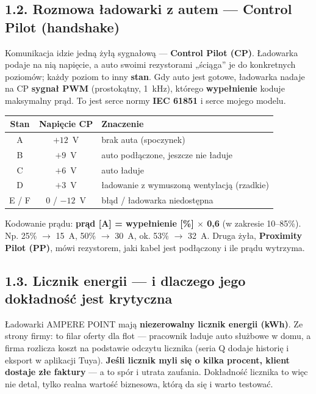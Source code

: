 \documentclass[11pt]{article}
\newcommand{\ra}{$\rightarrow$}
\newcommand{\key}[1]{\textbf{\color{navy}#1}}
\begin{document}
\subsection{1.2. Rozmowa ładowarki z autem --- Control Pilot (handshake)}

Komunikacja idzie jedną żyłą sygnałową --- \key{Control Pilot (CP)}. Ładowarka podaje na nią napięcie, a auto swoimi rezystorami „ściąga'' je do konkretnych poziomów; każdy poziom to inny \key{stan}. Gdy auto jest gotowe, ładowarka nadaje na CP \key{sygnał PWM} (prostokątny, 1~kHz), którego \key{wypełnienie} koduje maksymalny prąd. To jest serce normy \key{IEC 61851} i serce mojego modelu.

\begin{center}
\begin{tabularx}{0.92\linewidth}{@{}c c X@{}}
\toprule
\textbf{Stan} & \textbf{Napięcie CP} & \textbf{Znaczenie} \\
\midrule
A & $+12$~V & brak auta (spoczynek) \\
B & $+9$~V & auto podłączone, jeszcze nie ładuje \\
C & $+6$~V & auto ładuje \\
D & $+3$~V & ładowanie z wymuszoną wentylacją (rzadkie) \\
E / F & $0$ / $-12$~V & błąd / ładowarka niedostępna \\
\bottomrule
\end{tabularx}
\end{center}

Kodowanie prądu: \key{prąd [A] = wypełnienie [\%] $\times$ 0,6} (w zakresie 10--85\%). Np. 25\% \ra{} 15~A, 50\% \ra{} 30~A, ok. 53\% \ra{} 32~A. Druga żyła, \key{Proximity Pilot (PP)}, mówi rezystorem, jaki kabel jest podłączony i ile prądu wytrzyma.

\subsection{1.3. Licznik energii --- i dlaczego jego dokładność jest krytyczna}

Ładowarki AMPERE POINT mają \key{niezerowalny licznik energii (kWh)}. Ze strony firmy: to filar oferty dla flot --- pracownik ładuje auto służbowe w domu, a firma rozlicza koszt na podstawie odczytu licznika (seria Q dodaje historię i eksport w aplikacji Tuya). \key{Jeśli licznik myli się o kilka procent, klient dostaje złe faktury} --- a to spór i utrata zaufania. Dokładność licznika to więc nie detal, tylko realna wartość biznesowa, którą da się i warto testować.
\end{document}
